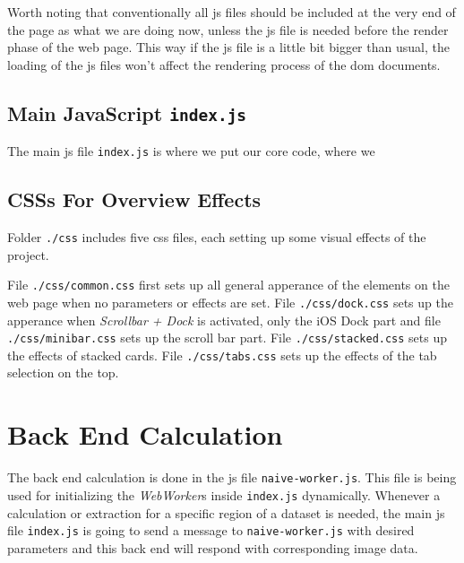 Worth noting that conventionally all \gls{js} files should be included at the very end of the page as what we are doing now, unless the \gls{js} file is needed before the render phase of the web page. This way if the \gls{js} file is a little bit bigger than usual, the loading of the \gls{js} files won't affect the rendering process of the \gls{dom} documents.


\subsection{Main JavaScript \texttt{index.js}}

The main \gls{js} file \texttt{index.js} is where we put our core code, where we 

\subsection{CSSs For Overview Effects}
\label{chap4:frontend-css}

Folder \texttt{./css} includes five \gls{css} files, each setting up some visual effects of the project.

File \texttt{./css/common.css} first sets up all general apperance of the elements on the web page when no parameters or effects are set. File \texttt{./css/dock.css} sets up the apperance when \emph{Scrollbar + Dock} is activated, only the iOS Dock part and file \texttt{./css/minibar.css} sets up the scroll bar part. File \texttt{./css/stacked.css} sets up the effects of stacked cards. File \texttt{./css/tabs.css} sets up the effects of the tab selection on the top.


\section{Back End Calculation}

The back end calculation is done in the \gls{js} file \texttt{naive-worker.js}. This file is being used for initializing the \emph{WebWorker}s inside \texttt{index.js} dynamically. Whenever a calculation or extraction for a specific region of a dataset is needed, the main \gls{js} file \texttt{index.js} is going to send a message to \texttt{naive-worker.js} with desired parameters and this back end will respond with corresponding image data.

